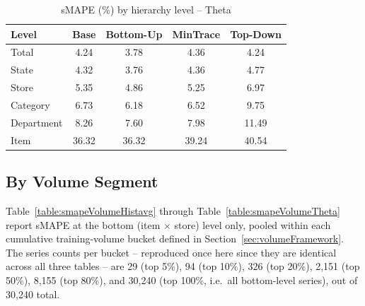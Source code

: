 \begin{table}[H]
	\centering
	\caption{sMAPE (\%) by hierarchy level -- Theta}
	\label{table:smapeLevelTheta}
	\begin{tabular}{l S[table-format=2.2] S[table-format=2.2] S[table-format=2.2] S[table-format=2.2]}
		\toprule
		\textbf{Level} & {\textbf{Base}} & {\textbf{Bottom-Up}} & {\textbf{MinTrace}} & {\textbf{Top-Down}} \\
		\midrule
		Total      &  4.24 &  3.78 &  4.36 &  4.24 \\
		State      &  4.32 &  3.76 &  4.36 &  4.77 \\
		Store      &  5.35 &  4.86 &  5.25 &  6.97 \\
		Category   &  6.73 &  6.18 &  6.52 &  9.75 \\
		Department &  8.26 &  7.60 &  7.98 & 11.49 \\
		Item       & 36.32 & 36.32 & 39.24 & 40.54 \\
		\bottomrule
	\end{tabular}
\end{table}

\subsection{By Volume Segment}
\label{sec:smapeByVolume}

Table~\ref{table:smapeVolumeHistavg} through Table~\ref{table:smapeVolumeTheta} report sMAPE at the bottom (item $\times$ store) level only, pooled within each cumulative training-volume bucket defined in Section~\ref{sec:volumeFramework}. The series counts per bucket -- reproduced once here since they are identical across all three tables -- are 29 (top 5\%), 94 (top 10\%), 326 (top 20\%), 2{,}151 (top 50\%), 8{,}155 (top 80\%), and 30{,}240 (top 100\%, i.e.\ all bottom-level series), out of 30{,}240 total.


